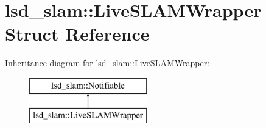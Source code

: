 \hypertarget{structlsd__slam_1_1_live_s_l_a_m_wrapper}{\section{lsd\-\_\-slam\-:\-:Live\-S\-L\-A\-M\-Wrapper Struct Reference}
\label{structlsd__slam_1_1_live_s_l_a_m_wrapper}
}
Inheritance diagram for lsd\-\_\-slam\-:\-:Live\-S\-L\-A\-M\-Wrapper\-:\begin{figure}[H]
\begin{center}
\leavevmode
\includegraphics[height=2.000000cm]{structlsd__slam_1_1_live_s_l_a_m_wrapper}
\end{center}
\end{figure}
